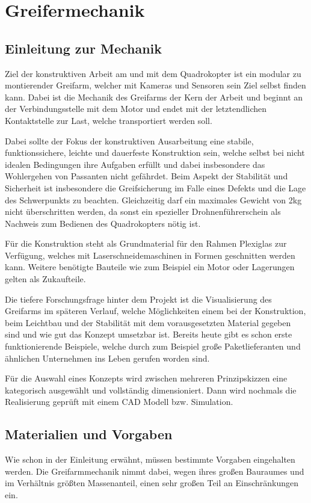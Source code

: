 \chapter{Greifermechanik}
\label{greifer}
\section{Einleitung zur Mechanik}
Ziel der konstruktiven Arbeit am und mit dem Quadrokopter ist ein modular zu montierender Greifarm, welcher mit Kameras und Sensoren sein Ziel selbst finden kann. Dabei ist die Mechanik des Greifarms der Kern der Arbeit und beginnt an der Verbindungsstelle mit dem Motor und endet mit der letztendlichen Kontaktstelle zur Last, welche transportiert werden soll.
\par
Dabei sollte der Fokus der konstruktiven Ausarbeitung eine stabile, funktionssichere, leichte und dauerfeste Konstruktion sein, welche selbst bei nicht idealen Bedingungen ihre Aufgaben erfüllt und dabei insbesondere das Wohlergehen von Passanten nicht gefährdet. Beim Aspekt der Stabilität und Sicherheit ist insbesondere die Greifsicherung im Falle eines Defekts und die Lage des Schwerpunkts zu beachten. Gleichzeitig darf ein maximales Gewicht von 2kg nicht überschritten werden, da sonst ein spezieller Drohnenführerschein als Nachweis zum Bedienen des Quadrokopters nötig ist.
\par 
Für die Konstruktion steht als Grundmaterial für den Rahmen Plexiglas zur Verfügung, welches mit Laserschneidemaschinen in Formen geschnitten werden kann. Weitere benötigte Bauteile wie zum Beispiel ein Motor oder Lagerungen gelten als Zukaufteile.
\par
Die tiefere Forschungsfrage hinter dem Projekt ist die Visualisierung des Greifarms im späteren Verlauf, welche Möglichkeiten einem bei der Konstruktion, beim Leichtbau und der Stabilität mit dem vorausgesetzten Material gegeben sind und wie gut das Konzept umsetzbar ist. Bereits heute gibt es schon erste funktionierende Beispiele, welche durch zum Beispiel große Paketlieferanten und ähnlichen Unternehmen ins Leben gerufen worden sind.
\par
Für die Auswahl eines Konzepts wird zwischen mehreren Prinzipskizzen eine kategorisch ausgewählt und vollständig dimensioniert. Dann wird nochmals die Realisierung geprüft mit einem CAD Modell bzw. Simulation.

\section{Materialien und Vorgaben}
Wie schon in der Einleitung erwähnt, müssen bestimmte Vorgaben eingehalten werden. Die Greifarmmechanik nimmt dabei, wegen ihres großen Bauraumes und im Verhältnis größten Massenanteil, einen sehr großen Teil an Einschränkungen ein.

